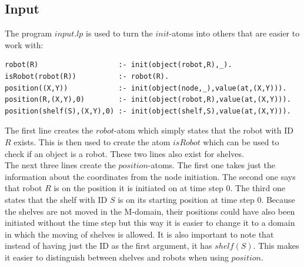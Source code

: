 \documentclass[runningheads]{llncs}
\begin{document}
\subsection{Input}
The program $input.lp$ is used to turn the $init$-atoms into others that are easier to work with:
\begin{verbatim}
robot(R)                   :- init(object(robot,R),_).
isRobot(robot(R))          :- robot(R).
position((X,Y))            :- init(object(node,_),value(at,(X,Y))).
position(R,(X,Y),0)        :- init(object(robot,R),value(at,(X,Y))).
position(shelf(S),(X,Y),0) :- init(object(shelf,S),value(at,(X,Y))).
\end{verbatim}
The first line creates the $robot$-atom which simply states that the robot with ID $R$ exists. This is then used to create the atom $isRobot$ which can be used to check if an object is a robot. These two lines also exist for shelves. \\
The next three lines create the $position$-atoms. The first one takes just the information about the coordinates from the node initiation. The second one says that robot $R$ is on the position it is initiated on at time step 0. The third one states that the shelf with ID $S$ is on its starting position at time step 0. Because the shelves are not moved in the M-domain, their positions could have also been initiated without the time step but this way it is easier to change it to a domain in which the moving of shelves is allowed. It is also important to note that instead of having just the ID as the first argument, it has $shelf(S)$. This makes it easier to distinguish between shelves and robots when using $position$.
\end{document}
